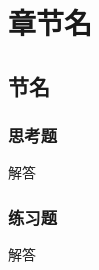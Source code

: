 \documentclass[cn,chinese,founder]{elegantbook}
\begin{document}
\chapter{章节名}
 \section{节名}
  \subsection{思考题}
      \begin{example}

      \end{example}
      \begin{solution}
          解答
      \end{solution}

  \subsection{练习题}
      \begin{exercise}
          
      \end{exercise}
      \begin{solution}
          解答
      \end{solution}
\end{document}
